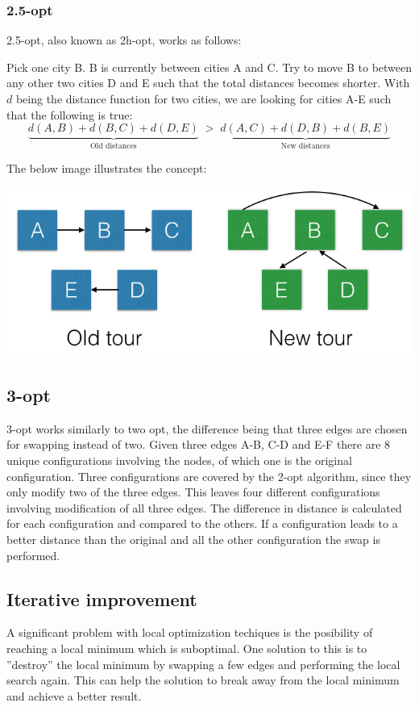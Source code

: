 \documentclass[paper=a4, fontsize=11pt,numbers=endperiod]{scrartcl} %
\numberwithin{equation}{section} %
\numberwithin{figure}{section} %
\numberwithin{table}{section} %
\begin{document}
\subsubsection{2.5-opt}
2.5-opt, also known as 2h-opt, works as follows:

Pick one city B. B is currently between cities A and C. Try to move B to between any other two cities D and E such that the total distances becomes shorter. With $d$ being the distance function for two cities, we are looking for cities A-E such that the following is true:
\[
    \underbrace{d(A,B) + d(B,C) + d(D,E)}_\text{Old distances}\; > \;\underbrace{d(A,C) + d(D,B) + d(B,E)}_\text{New distances}
\]

The below image illustrates the concept:

\begin{center}
\includegraphics[scale=0.4]{25opt}
\end{center}

\subsection{3-opt}
3-opt works similarly to two opt, the difference being that three edges are chosen for swapping instead of two.
Given three edges A-B, C-D and E-F there are 8 unique configurations involving the nodes, of which one is the original configuration.
Three configurations are covered by the 2-opt algorithm, since they only modify two of the three edges.
This leaves four different configurations involving modification of all three edges.
The difference in distance is calculated for each configuration and compared to the others.
If a configuration leads to a better distance than the original and all the other configuration the swap is performed.



\subsection{Iterative improvement}
A significant problem with local optimization techiques is the posibility of reaching a local minimum which is suboptimal.
One solution to this is to ''destroy'' the local minimum by swapping a few edges and performing the local search again.
This can help the solution to break away from the local minimum and achieve a better result.
\end{document}
